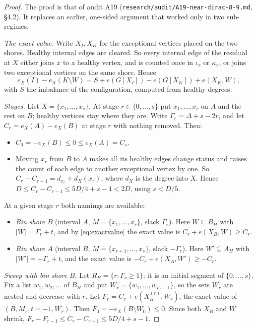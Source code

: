 \documentclass[11pt]{article}
\theoremstyle{definition}
\begin{document}
\begin{proof}
The proof is that of audit A19 (\texttt{research/audit/A19-near-dirac-8-9.md}, \S4.2). It replaces an earlier, one-sided argument that worked only in two sub-regimes.

\emph{The exact value.} Write $X_I,X_K$ for the exceptional vertices placed on the two shores. Healthy internal edges are cleared. So every internal edge of the residual at $X$ either joins $x$ to a healthy vertex, and is counted once in $\iota_x$ or $\kappa_x$, or joins two exceptional vertices on the same shore. Hence
\begin{equation}\label{eq:exactvalue}
e_X(I)-e_X(K\setminus W)=S+e(G[X_I])-e(G[X_K])+e(X_K,W),
\end{equation}
with $S$ the imbalance of the configuration, computed from healthy degrees.

\emph{Stages.} List $X=\{x_1,\dots,x_s\}$. At stage $r\in\{0,\dots,s\}$ put $x_1,\dots,x_r$ on $A$ and the rest on $B$; healthy vertices stay where they are. Write $\Gamma_r=\Delta+s-2r$, and let $C_r=e_X(A)-e_X(B)$ at stage $r$ with nothing removed. Then:
\begin{itemize}[nosep]
\item $C_0=-e_X(B)\le0\le e_X(A)=C_s$.
\item Moving $x_r$ from $B$ to $A$ makes all its healthy edges change status and raises the count of each edge to another exceptional vertex by one. So $C_r-C_{r-1}=d_{x_r}+d_X(x_r)$, where $d_X$ is the degree into $X$. Hence $D\le C_r-C_{r-1}\le5D/4+s-1<2D$, using $s<D/5$.
\end{itemize}
At a given stage $r$ both namings are available:
\begin{itemize}[nosep]
\item \emph{Bin shore $B$} (interval $A$, $M=\{x_1,\dots,x_r\}$, slack $\Gamma_r$). Here $W\subseteq B_H$ with $|W|=\Gamma_r+t$, and by \eqref{eq:exactvalue} the exact value is $C_r+e(X_B,W)\ge C_r$.
\item \emph{Bin shore $A$} (interval $B$, $M=\{x_{r+1},\dots,x_s\}$, slack $-\Gamma_r$). Here $W'\subseteq A_H$ with $|W'|=-\Gamma_r+t$, and the exact value is $-C_r+e(X_A,W')\ge-C_r$.
\end{itemize}

\emph{Sweep with bin shore $B$.} Let $R_B=\{r:\Gamma_r\ge1\}$; it is an initial segment of $\{0,\dots,s\}$. Fix a list $w_1,w_2,\dots$ of $B_H$ and put $W_r=\{w_1,\dots,w_{\Gamma_r-1}\}$, so the sets $W_r$ are nested and decrease with $r$. Let $F_r=C_r+e(X_B^{(r)},W_r)$, the exact value of $(B,M_r,t=-1,W_r)$. Then $F_0=-e_X(B\setminus W_0)\le0$. Since both $X_B$ and $W$ shrink, $F_r-F_{r-1}\le C_r-C_{r-1}\le5D/4+s-1$.


\end{proof}
\end{document}
